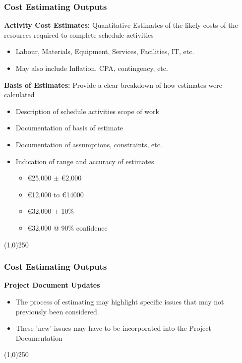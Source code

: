 \begin{frame}
\frametitle{Cost Estimating \hfill Outputs}
\textbf{Activity Cost Estimates:} Quantitative Estimates of the likely costs of the resources required to complete schedule activities
\begin{itemize}
	\item Labour, Materials, Equipment, Services, Facilities, IT, etc.
	\item May also include Inflation, CPA, contingency, etc.
\end{itemize}
\textbf{Basis of Estimates:} Provide a clear breakdown of how estimates were calculated
\begin{itemize}
	\item Description of schedule activities scope of work
	\item Documentation of basis of estimate
	\item Documentation of assumptions, constraints, etc.
	\item Indication of range and accuracy of estimates
	\begin{itemize}
		\item \euro25,000 $\pm$ \euro2,000
		\item \euro12,000 to \euro14000 
		\item \euro32,000 $\pm$ 10\%
		\item \euro32,000 @ 90\% confidence
	\end{itemize}
\end{itemize}
\end{frame}
\begin{center}\line(1,0){250}\end{center}







\begin{frame}
\frametitle{Cost Estimating \hfill Outputs}
\textbf{Project Document Updates}\\
\begin{itemize}
	\item The process of estimating may highlight specific issues that may not previously been considered.
	\item These 'new' issues may have to be incorporated into the Project Documentation
\end{itemize}
\end{frame}
\begin{center}\line(1,0){250}\end{center}








